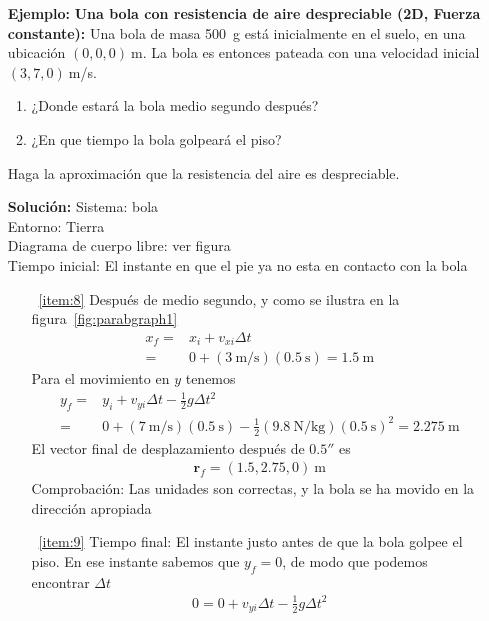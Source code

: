 \begin{itemize}
\item[\textbf{Ejemplo:}] \textbf{Una bola con resistencia de aire despreciable (2D, Fuerza constante):}
Una bola de masa 500~g está inicialmente en el suelo, en una ubicación $(0,0,0)\ $m. La bola es entonces pateada con una velocidad inicial $(3,7,0)\ $m/s.
\begin{enumerate}
\item ¿Donde estará la bola medio segundo después?
\label{item:8}
\item ¿En que tiempo la bola golpeará el piso?
\label{item:9}
\end{enumerate}
Haga la aproximación que la resistencia del aire es despreciable.


\item[\textbf{Solución:}] Sistema: bola\\
Entorno: Tierra\\
Diagrama de cuerpo libre: ver figura\\
Tiempo inicial: El instante en que el pie ya no esta en contacto con la bola
\begin{itemize}
\item[~\ref{item:8}]
Después de medio segundo, y como se ilustra en la figura~\ref{fig:parabgraph1}
\begin{align}
  x_f=&x_i+v_{xi}\Delta t\nonumber\\
  =&0+(3\ \text{m/s})(0.5\ \text{s})=1.5\ \text{m}
\end{align}
Para el movimiento en $y$ tenemos
\begin{align}
  y_f=&y_i+v_{yi}\Delta t-\frac{1}{2}g \Delta t^2\nonumber\\
=& 0+(7\ \text{m/s})(0.5\ \text{s})-\frac{1}{2}(9.8\ \text{N/kg})(0.5\ \text{s})^2=2.275\ \text{m}
\end{align}
El vector final de desplazamiento después de $0.5\second$ es
\begin{align}
  \mathbf{r}_f=(1.5,2.75,0)\ \text{m}
\end{align}
Comprobación: Las unidades son correctas, y la bola se ha movido en la dirección apropiada
\item[~\ref{item:9}] Tiempo final: El instante justo antes de que la bola golpee el piso. En ese instante sabemos que $y_f=0$, de modo que podemos encontrar $\Delta t$
  \begin{align*}
    0=0+v_{yi}\Delta t-\frac{1}{2}g\Delta t^2
  \end{align*}
  \begin{align*}

\end{align*}
\end{itemize}
\end{itemize}
